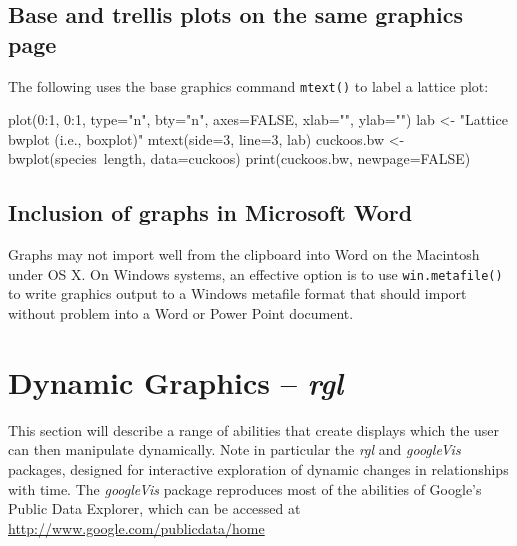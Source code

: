 \documentclass{tufte-book}\usepackage[]{graphicx}\usepackage[]{color}
\newcommand{\txtt}[1]{\texttt{#1}}
\begin{document}
\subsection*{Base and trellis plots on the same graphics page}

The following uses the base graphics command \txtt{mtext()}
to label a lattice plot:
\begin{Schunk}
\begin{Sinput}
plot(0:1, 0:1, type="n", bty="n", axes=FALSE,
     xlab="", ylab="")
lab <- "Lattice bwplot (i.e., boxplot)"
mtext(side=3, line=3, lab)
cuckoos.bw <- bwplot(species~length, data=cuckoos)
print(cuckoos.bw, newpage=FALSE)
\end{Sinput}
\end{Schunk}

\subsection*{Inclusion of graphs in Microsoft Word}

Graphs may not import well from the clipboard into Word on the
Macintosh under OS X.  On Windows systems, an effective option is to
use \txtt{win.metafile()} to write graphics output to a Windows
metafile format that should import without problem into a Word or
Power Point document.


\section{Dynamic Graphics -- \textit{rgl}}\label{sec:dynamicg}

This section will describe a range of abilities that create displays
which the user can then manipulate dynamically.  Note in particular
the {\em rgl} and {\em googleVis} packages, designed for interactive
exploration of dynamic changes in relationships with time.  The 
{\em googleVis} package reproduces most of the abilities of Google's
Public Data Explorer, which can be accessed at
\url{http://www.google.com/publicdata/home}
\end{document}
